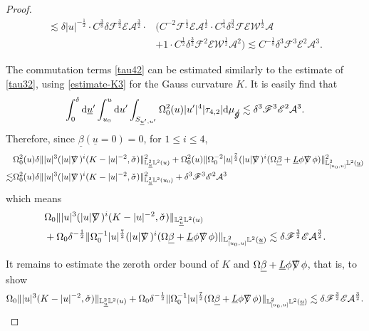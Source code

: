 \documentclass[11pt,reqno]{amsart}
\theoremstyle{definition}
\numberwithin{equation}{section}
\newcommand{\D}{\mathrm{d}}
\renewcommand{\L}{\mathbb{L}}
\def\betab{\underline{\beta}}
\def\Lb{\underline{L}}
\def\sigmac{\check{\sigma}}
\def\ub{\underline{u}}
\def\nablas{\mbox{$\nabla \mkern -13mu /$ }}
\def\gs{\mbox{$g \mkern -9mu /$}}
\begin{document}
\begin{proof}
\begin{align*}
\lesssim\delta|u|^{-\frac{1}{2}}\cdot C^{\frac{3}{8}}\delta\mathscr{F}^\frac{3}{2}\mathscr{E}\mathcal{A}^\frac{3}{2}\cdot &(C^{-2}\mathscr{F}^{\frac{1}{2}}\mathscr{E}\mathcal{A}^{\frac{1}{2}}\cdot C^{\frac{1}{4}}\delta^{\frac{3}{2}}\mathscr{F}\mathscr{E}\mathscr{W}^{\frac{1}{2}}\mathcal{A}\\
&+1\cdot C^{\frac{1}{2}}\delta^{\frac{3}{2}}\mathscr{F}^2\mathscr{E}\mathscr{W}^{\frac{1}{2}}\mathcal{A}^2)\lesssim C^{-\frac{1}{8}}\delta^3\mathscr{F}^3\mathscr{E}^2\mathcal{A}^3.
\end{align*}

The commutation terms \eqref{tau42} can be estimated similarly to the estimate of \eqref{tau32}, using \eqref{estimate-K3} for the Gauss curvature $K$. It is easily find that
\begin{align*}
\int_0^\delta\D\ub'\int_{u_0}^u\D u'\int_{S_{\ub',u'}}\Omega_0^2(u)|u'|^4|\tau_{4,2}|\D\mu_{\gs}\lesssim \delta^3\mathscr{F}^3\mathscr{E}^2\mathcal{A}^3.
\end{align*}
Therefore, since $\betab(\ub=0)=0$, for $1\le i\le4$,
\begin{align*}
&\Omega_0^2(u)\delta\||u|^3(|u|\nablas)^i(K-|u|^{-2},\sigmac)\|_{\L^2_{\ub}\L^2(u)}^2+\Omega_0^2(u)\|\Omega_0^{-2}|u|^{\frac{7}{2}}(|u|\nablas)^i(\Omega\betab+\Lb\phi\nablas\phi)\|_{\L^2_{[u_0,u]}\L^2(\ub)}^2\\
\lesssim&\Omega_0^2(u)\delta\||u|^3(|u|\nablas)^i(K-|u|^{-2},\sigmac)\|_{\L^2_{\ub}\L^2(u_0)}^2+\delta^3\mathscr{F}^3\mathscr{E}^2\mathcal{A}^3\end{align*}
which means
\begin{equation}\label{estimate-K-sigmac}
\begin{split}
&\Omega_0\||u|^3(|u|\nablas)^i(K-|u|^{-2},\sigmac)\|_{\L^2_{\ub}\L^2(u)}\\
&+\Omega_0\delta^{-\frac{1}{2}}\|\Omega_0^{-1}|u|^{\frac{7}{2}}(|u|\nablas)^i(\Omega\betab+\Lb\phi\nablas\phi)\|_{\L^2_{[u_0,u]}\L^2(\ub)}\lesssim\delta\mathscr{F}^\frac{3}{2}\mathscr{E}\mathcal{A}^\frac{3}{2}.\end{split}\end{equation}

It remains to estimate the zeroth order bound of $K$ and $\Omega\betab+\Lb\phi\nablas\phi$, that is, to show
\begin{align*}
\Omega_0\||u|^3(K-|u|^{-2},\sigmac)\|_{\L^2_{\ub}\L^2(u)}+\Omega_0\delta^{-\frac{1}{2}}\|\Omega_0^{-1}|u|^{\frac{7}{2}}(\Omega\betab+\Lb\phi\nablas\phi)\|_{\L^2_{[u_0,u]}\L^2(\ub)}\lesssim\delta\mathscr{F}^\frac{3}{2}\mathscr{E}\mathcal{A}^\frac{3}{2}.
\end{align*}


\end{proof}
\end{document}
